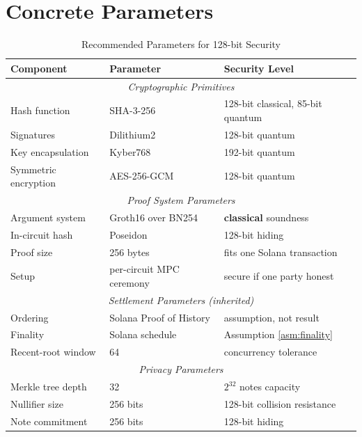 \documentclass[11pt,a4paper]{article}
\begin{document}
\section{Concrete Parameters}

\begin{table}[h]
\centering
\caption{Recommended Parameters for 128-bit Security}
\begin{tabular}{@{}lll@{}}
\toprule
\textbf{Component} & \textbf{Parameter} & \textbf{Security Level} \\ \midrule
\multicolumn{3}{c}{\textit{Cryptographic Primitives}} \\
Hash function & SHA-3-256 & 128-bit classical, 85-bit quantum \\
Signatures & Dilithium2 & 128-bit quantum \\
Key encapsulation & Kyber768 & 192-bit quantum \\
Symmetric encryption & AES-256-GCM & 128-bit quantum \\
\midrule
\multicolumn{3}{c}{\textit{Proof System Parameters}} \\
Argument system & Groth16 over BN254 & \textbf{classical} soundness \\
In-circuit hash & Poseidon & 128-bit hiding \\
Proof size & 256 bytes & fits one Solana transaction \\
Setup & per-circuit MPC ceremony & secure if one party honest \\
\midrule
\multicolumn{3}{c}{\textit{Settlement Parameters (inherited)}} \\
Ordering & Solana Proof of History & assumption, not result \\
Finality & Solana schedule & Assumption \ref{asm:finality} \\
Recent-root window & 64 & concurrency tolerance \\
\midrule
\multicolumn{3}{c}{\textit{Privacy Parameters}} \\
Merkle tree depth & 32 & $2^{32}$ notes capacity \\
Nullifier size & 256 bits & 128-bit collision resistance \\
Note commitment & 256 bits & 128-bit hiding \\
\bottomrule
\end{tabular}
\end{table}
\end{document}

